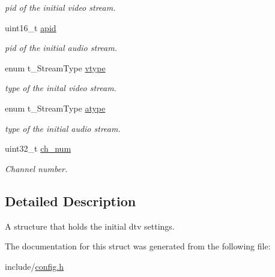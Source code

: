\begin{DoxyCompactItemize}
\begin{DoxyCompactList}\small\item\em pid of the initial video stream. \end{DoxyCompactList}\item 
uint16\+\_\+t \hyperlink{structconfig__init__ch__info_ad3e02f3dab113c0c9754183d847f82fe}{apid}\hypertarget{structconfig__init__ch__info_ad3e02f3dab113c0c9754183d847f82fe}{}\label{structconfig__init__ch__info_ad3e02f3dab113c0c9754183d847f82fe}

\begin{DoxyCompactList}\small\item\em pid of the initial audio stream. \end{DoxyCompactList}\item 
enum t\+\_\+\+Stream\+Type \hyperlink{structconfig__init__ch__info_ab41965db2e503fc08327aa8f389be804}{vtype}\hypertarget{structconfig__init__ch__info_ab41965db2e503fc08327aa8f389be804}{}\label{structconfig__init__ch__info_ab41965db2e503fc08327aa8f389be804}

\begin{DoxyCompactList}\small\item\em type of the inital video stream. \end{DoxyCompactList}\item 
enum t\+\_\+\+Stream\+Type \hyperlink{structconfig__init__ch__info_a7bbc55cdffa6b7df3235f49393d51c4b}{atype}\hypertarget{structconfig__init__ch__info_a7bbc55cdffa6b7df3235f49393d51c4b}{}\label{structconfig__init__ch__info_a7bbc55cdffa6b7df3235f49393d51c4b}

\begin{DoxyCompactList}\small\item\em type of the initial audio stream. \end{DoxyCompactList}\item 
uint32\+\_\+t \hyperlink{structconfig__init__ch__info_a7584861f004ba6d994cd6439f30ab229}{ch\+\_\+num}\hypertarget{structconfig__init__ch__info_a7584861f004ba6d994cd6439f30ab229}{}\label{structconfig__init__ch__info_a7584861f004ba6d994cd6439f30ab229}

\begin{DoxyCompactList}\small\item\em Channel number. \end{DoxyCompactList}\end{DoxyCompactItemize}


\subsection{Detailed Description}
A structure that holds the initial dtv settings. 

The documentation for this struct was generated from the following file\+:\begin{DoxyCompactItemize}
\item 
include/\hyperlink{config_8h}{config.\+h}\end{DoxyCompactItemize}
